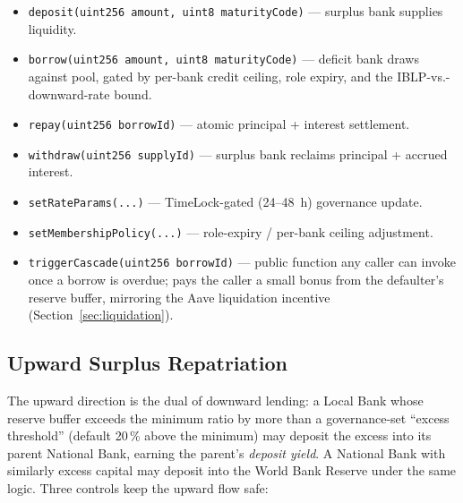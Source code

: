 \documentclass[12pt,a4paper]{report}
\begin{document}
\begin{itemize}[noitemsep]
\item \texttt{deposit(uint256 amount, uint8 maturityCode)} --- surplus bank supplies liquidity.
\item \texttt{borrow(uint256 amount, uint8 maturityCode)} --- deficit bank draws against pool, gated by per-bank credit ceiling, role expiry, and the IBLP-vs.-downward-rate bound.
\item \texttt{repay(uint256 borrowId)} --- atomic principal + interest settlement.
\item \texttt{withdraw(uint256 supplyId)} --- surplus bank reclaims principal + accrued interest.
\item \texttt{setRateParams(...)} --- TimeLock-gated (24--48~h) governance update.
\item \texttt{setMembershipPolicy(...)} --- role-expiry / per-bank ceiling adjustment.
\item \texttt{triggerCascade(uint256 borrowId)} --- public function any caller can invoke once a borrow is overdue; pays the caller a small bonus from the defaulter's reserve buffer, mirroring the Aave liquidation incentive (Section~\ref{sec:liquidation}).
\end{itemize}

\subsection{Upward Surplus Repatriation}
\label{sec:upward-flow}

The upward direction is the dual of downward lending: a Local Bank whose reserve buffer exceeds the minimum ratio by more than a governance-set ``excess threshold'' (default 20\,\% above the minimum) may deposit the excess into its parent National Bank, earning the parent's \emph{deposit yield}. A National Bank with similarly excess capital may deposit into the World Bank Reserve under the same logic. Three controls keep the upward flow safe:
\end{document}
